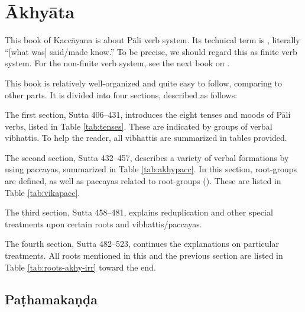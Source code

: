 \chapter{Ākhyāta}

This book of Kaccāyana is about Pāli verb system. Its technical term is , literally ``[what was] said/made know.'' To be precise, we should regard this as finite verb system. For the non-finite verb system, see the next book on .

This book is relatively well-organized and quite easy to follow, comparing to other parts. It is divided into four sections, described as follows:

The first section, Sutta 406--431, introduces the eight tenses and moods of Pāli verbs, listed in Table \ref{tab:tenses}. These are indicated by groups of verbal vibhattis. To help the reader, all vibhattis are summarized in tables provided.

The second section, Sutta 432--457, describes a variety of verbal formations by using paccayas, summarized in Table \ref{tab:akhypacc}. In this section, root-groups are defined, as well as paccayas related to root-groups (). These are listed in Table \ref{tab:vikapacc}.

The third section, Sutta 458--481, explains reduplication and other special treatments upon certain roots and vibhattis/paccayas.

The fourth section, Sutta 482--523, continues the explanations on particular treatments. All roots mentioned in this and the previous section are listed in Table \ref{tab:roots-akhy-irr} toward the end.

\section{Paṭhamakaṇḍa}
\raggedbottom

